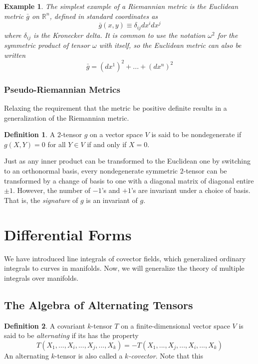 \documentclass{article}
\newtheorem{example}{Example}[section]
\theoremstyle{remark}
\theoremstyle{definition}
\newtheorem{definition}{Definition}[section]
\begin{document}
\begin{example}
The simplest example of a Riemannian metric is the \textit{Euclidean metric} $\bar{g}$ on $\mathbb{R}^n$, defined in standard coordinates as 
\[\bar{g}(x, y) \equiv \delta_{ij} dx^i dx^j\]
where $\delta_{ij}$ is the Kronecker delta. It is common to use the notation $\omega^2$ for the symmetric product of tensor $\omega$ with itself, so the Euclidean metric can also be written 
\[\bar{g} = (dx^1)^2 + ... + (dx^n)^2\]
\end{example}

\subsubsection{Pseudo-Riemannian Metrics}
Relaxing the requirement that the metric be positive definite results in a generalization of the Riemannian  metric. 

\begin{definition}
A $2$-tensor $g$ on a vector space $V$ is said to be nondegenerate if $g(X, Y) = 0$ for all $Y \in V$ if and only if $X = 0$. 
\end{definition}

Just as any inner product can be transformed to the Euclidean one by switching to an orthonormal basis, every nondegenerate  symmetric $2$-tensor can be transformed by a change of basis to one with a diagonal matrix of diagonal entire $\pm 1$. However, the number of $-1$'s and $+1$'s are invariant under a choice of basis. That is, the \textit{signature} of $g$ is an invariant of $g$. 

\section{Differential Forms}

We have introduced line integrals of covector fields, which generalized ordinary integrals to curves in manifolds. Now, we will generalize the theory of multiple integrals over manifolds. 

\subsection{The Algebra of Alternating Tensors}
\begin{definition}
A covariant $k$-tensor $T$ on a finite-dimensional vector space $V$ is said to be \textit{alternating} if its has the property
\[T(X_1, ..., X_i, ..., X_j, ..., X_k) = - T(X_1, ..., X_j, ..., X_i, ..., X_k)\]
An alternating $k$-tensor is also called a \textit{$k$-covector}. Note that this 
\end{definition}
\end{document}
